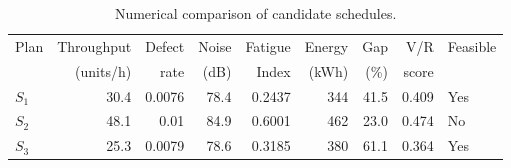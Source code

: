 \begin{table}[htbp]
\centering
\caption{Numerical comparison of candidate schedules.}
\label{tab:numerical-sim}
\small
\begin{tabular}{@{}lrrrrrrrl@{}}
\toprule
Plan & Throughput & Defect & Noise & Fatigue & Energy & Gap & V/R & Feasible \\
     & (units/h)  & rate   & (dB)  & Index   & (kWh)  & (\%) & score &         \\
\midrule
$S_{1}$ & 30.4 & 0.0076 & 78.4 & 0.2437 & 344 & 41.5 & 0.409 & Yes \\
$S_{2}$ & 48.1 & 0.01 & 84.9 & 0.6001 & 462 & 23.0 & 0.474 & No \\
$S_{3}$ & 25.3 & 0.0079 & 78.6 & 0.3185 & 380 & 61.1 & 0.364 & Yes \\
\bottomrule
\end{tabular}
\end{table}
